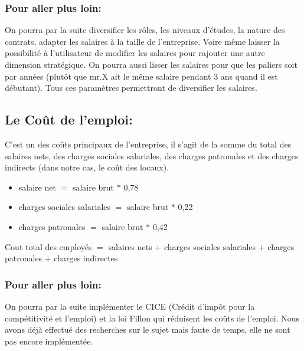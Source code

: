 \subsubsection*{Pour aller plus loin:}



On pourra par la suite diversifier les rôles, les niveaux d’études, la nature des contrats, adapter les salaires à  la taille de l’entreprise. Voire même laisser la possibilité à  l’utilisateur de modifier les salaires pour rajouter une autre dimension stratégique. On pourra aussi lisser les salaires pour que les paliers soit par années (plutôt que mr.X ait le même salaire pendant 3 ans quand il est débutant). Tous ces paramètres permettront de diversifier les salaires.



\subsection{Le Coût de l’emploi:}



C’est un des coûts principaux de l’entreprise, il s’agit de la somme du total des salaires nets, des charges sociales salariales, des charges patronales et des charges indirects (dans notre cas, le coût des locaux).\\



\begin{itemize}
    \item[] salaire net $=$ salaire brut $*$ 0,78

    \item[] charges sociales salariales $=$ salaire brut $*$ 0,22

    \item[] charges patronales $=$ salaire brut $*$ 0,42\\
\end{itemize}



Cout total des employés $=$ salaires nets $+$ charges sociales salariales $+$ charges patronales $+$ charges indirectes



\subsubsection*{Pour aller plus loin:}



On pourra par la suite implémenter le CICE (Crédit d'impôt pour la compétitivité et l'emploi) et la loi Fillon qui réduisent les coûts de l’emploi. Nous avons déjà effectué des recherches sur le sujet mais faute de temps, elle ne sont pas encore implémentée.



